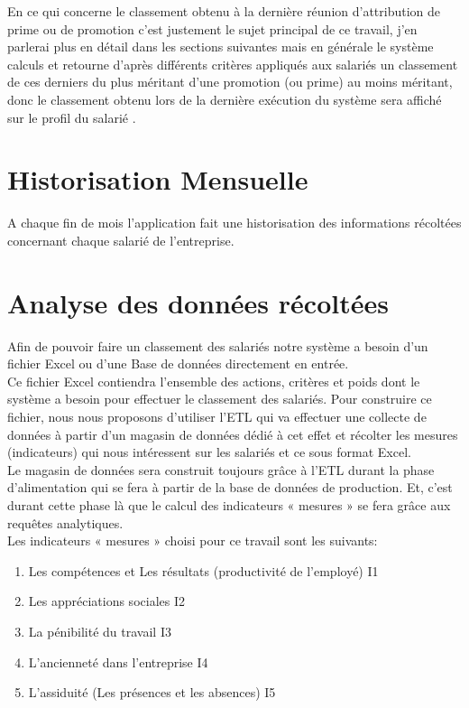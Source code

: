 En ce qui concerne le classement obtenu à la dernière réunion d’attribution de prime ou de promotion c’est justement le sujet principal de ce travail, j’en parlerai plus en détail dans les sections suivantes mais en générale le système calculs et retourne d’après différents critères appliqués aux salariés un classement de ces derniers du plus méritant d’une promotion (ou prime) au moins méritant, donc le classement obtenu lors de la dernière exécution du système sera affiché sur le profil du salarié .      

\section{Historisation Mensuelle}

A chaque fin de mois l’application fait une historisation des informations récoltées concernant chaque salarié de l’entreprise.  

\section{Analyse des données récoltées }

Afin de pouvoir faire un classement des salariés notre système a besoin d’un fichier Excel ou d’une Base de données directement en entrée.\\
Ce fichier Excel contiendra l’ensemble des actions, critères et poids dont le système a besoin pour effectuer le classement des salariés. Pour construire ce fichier, nous nous proposons d'utiliser l'ETL qui va effectuer une collecte de données à partir d’un magasin de données dédié à cet effet et récolter les mesures (indicateurs) qui nous intéressent sur les salariés et ce sous format Excel. \\
Le magasin de données sera construit toujours grâce à l’ETL durant la phase d’alimentation qui se fera à partir de la base de données de production. Et, c’est durant cette phase là que le calcul des indicateurs « mesures » se fera grâce aux requêtes analytiques.  \\
\newpage
Les indicateurs « mesures » choisi pour ce travail sont les suivants:
\begin{enumerate}
\item Les compétences et Les résultats (productivité de l’employé)   I1
\item Les appréciations sociales  I2
\item La pénibilité du travail   I3
\item L’ancienneté dans l'entreprise   I4
\item L’assiduité (Les présences et les absences)    I5
\end{enumerate}

